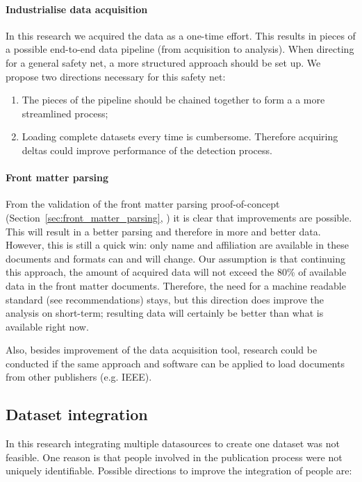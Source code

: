 \documentclass{ou-report}
\begin{document}
\paragraph{Industrialise data acquisition}
In this research we acquired the data as a one-time effort. This results in
pieces of a possible end-to-end data pipeline (from acquisition to analysis). 
When directing for a general safety net, a more
structured approach should be set up. We propose two directions necessary for
this safety net:
\begin{enumerate}
    \item The pieces of the pipeline should be chained together to form a
        a more streamlined process;
    \item Loading complete datasets every time is cumbersome. Therefore
        acquiring deltas could improve performance of the detection process.
\end{enumerate}

\paragraph{Front matter parsing}
From the validation of the front matter parsing proof-of-concept
(Section~\ref{sec:front_matter_parsing}, ) 
it is clear that improvements are possible. This will result in a better parsing 
and therefore in more and better data.
However, this is still a quick win: only name and affiliation are available in 
these documents and formats can and will change. Our assumption is that 
continuing this approach, the amount of acquired data will not exceed the 80\% 
of available data in the front matter documents.
Therefore, the need for a machine readable standard (see recommendations) stays,
but this direction does improve the analysis on short-term; resulting data will 
certainly be better than what is available right now.

Also, besides improvement of the data acquisition tool, research could be 
conducted if the same approach and software can be applied to load documents 
from other publishers (e.g. IEEE).

\subsection{Dataset integration}
In this research integrating multiple datasources to create one dataset was not
feasible. One reason is that people involved in the publication process were not
uniquely identifiable. Possible directions to improve the integration of people are:
\end{document}
